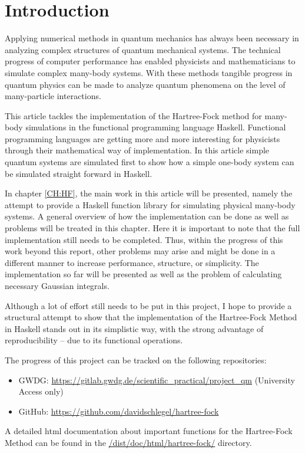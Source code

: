 \documentclass[twoside,        %
			   11pt,			%
               BCOR10mm,       %
               ngerman,english  %
               ]{scrartcl}
\begin{document}


\section{Introduction}
Applying numerical methods in quantum mechanics has always been necessary in analyzing complex structures of quantum mechanical systems. The technical progress of computer performance has enabled physicists and mathematicians to simulate complex many-body systems. With these methods tangible progress in quantum physics can be made to analyze quantum phenomena on the level of many-particle interactions. 

This article tackles the implementation of the Hartree-Fock method for many-body simulations in the functional programming language Haskell. Functional programming languages are getting more and more interesting for physicists through their mathematical way of implementation. In this article simple quantum systems are simulated first to show how a simple one-body system can be simulated straight forward in Haskell.

In chapter \ref{CH:HF}, the main work in this article will be presented, namely the attempt to provide a Haskell function library for simulating physical many-body systems. A general overview of how the implementation can be done as well as problems will be treated in this chapter. Here it is important to note that the full implementation still needs to be completed. Thus, within the progress of this work beyond this report, other problems may arise and might be done in a different manner to increase performance, structure, or simplicity. The implementation so far will be presented as well as the problem of calculating necessary Gaussian integrals.

Although a lot of effort still needs to be put in this project, I hope to provide a structural attempt to show that the implementation of the Hartree-Fock Method in Haskell stands out in its simplistic way, with the strong advantage of reproducibility -- due to its functional operations.

The progress of this project can be tracked on the following repositories:
\begin{itemize}
\item GWDG: \url{https://gitlab.gwdg.de/scientific_practical/project_qm} (University Access only)

\item GitHub: \url{https://github.com/davidschlegel/hartree-fock}
\end{itemize}
A detailed html documentation about important functions for the Hartree-Fock Method can be found in the \url{/dist/doc/html/hartree-fock/} directory.
\end{document}
